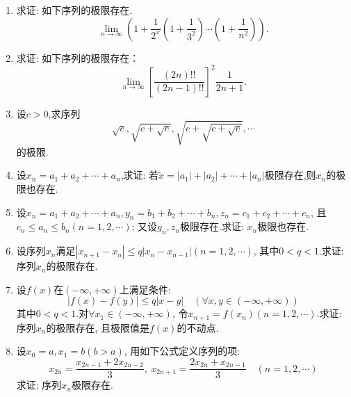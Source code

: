 \begin{enumerate}
\begin{solution}
	\end{solution}
	\item 求证: 如下序列的极限存在.
	$$
	\lim\limits_{n\rightarrow \infty}(1+\frac{1}{2^x}(1+\frac{1}{3^2})\cdots(1+\frac{1}{n^2})).
	$$
	\item 求证: 如下序列的极限存在：
	$$
	\lim\limits_{n\rightarrow \infty} \left[\frac{(2n)!!}{(2n-1)!!}\right]^2\frac{1}{2n+1}.
	$$
	\item 设$c>0$,求序列
	$$
	\sqrt{c}, \sqrt{c+\sqrt{c}},\sqrt{c+\sqrt{c+\sqrt{c}}}, \cdots
	$$
	的极限.
	\item 设$x_n=a_1+a_2+\cdots+a_n$,求证: 若$\tilde{x}=|a_1|+|a_2|+\cdots+|a_n|$极限存在,则${x_n}$的极限也存在.
	\item 设$x_n=a_1+a_2+\cdots+a_n,y_n=b_1+b_2+\cdots+b_n,z_n=c_1+c_2+\cdots+c_n$, 且$c_n\le a_n\le b_n(n=1,2,\cdots)$; 又设${y_n},{z_n}$极限存在.求证: ${x_n}$极限也存在.
	\item 设序列${x_n}$满足$|x_{n+1}-x_n|\le q|x_n-x_{n-1}|(n=1,2,\cdots)$, 其中$0<q<1$.求证:
	序列${x_n}$的极限存在.
	\item 设$f(x)$在$(-\infty,+\infty)$上满足条件:
	$$|f(x)-f(y)|\le q|x-y|\quad (\forall x,y \in (-\infty,+\infty))$$
	其中$0<q<1$.对$\forall x_1\in (-\infty,+\infty)$, 令$x_{n+1}=f(x_n)(n=1,2,\cdots)$.求证: 序列${x_n}$的极限存在, 且极限值是$f(x)$的不动点.
	\item 设$x_0=a,x_1=b(b>a)$, 用如下公式定义序列的项: $$
	x_{2n}=\frac{x_{2n-1}+2x_{2n-2}}{3},\ x_{2n+1}=\frac{2x_{2n}+x_{2n-1}}{3}\quad (n = 1,2,\cdots)$$
	求证: 序列${x_n}$极限存在.
\end{enumerate}
